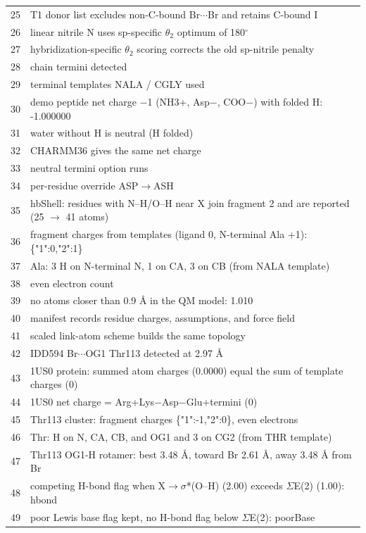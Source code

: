 {\begin{longtable}{rp{14.5cm}}
25 & T1 donor list excludes non-C-bound Br$\cdots$Br and retains C-bound I\\
26 & linear nitrile N uses sp-specific $\theta_2$ optimum of 180$^\circ$\\
27 & hybridization-specific $\theta_2$ scoring corrects the old sp-nitrile penalty\\
28 & chain termini detected\\
29 & terminal templates NALA / CGLY used\\
30 & demo peptide net charge $-$1 (NH3+, Asp$-$, COO$-$) with folded H: -1.000000\\
31 & water without H is neutral (H folded)\\
32 & CHARMM36 gives the same net charge\\
33 & neutral termini option runs\\
34 & per-residue override ASP$\to$ASH\\
35 & hbShell: residues with N--H/O--H near X join fragment 2 and are reported (25 $\to$ 41 atoms)\\
36 & fragment charges from templates (ligand 0, N-terminal Ala +1): \{"1":0,"2":1\}\\
37 & Ala: 3 H on N-terminal N, 1 on CA, 3 on CB (from NALA template)\\
38 & even electron count\\
39 & no atoms closer than 0.9 \AA{} in the QM model: 1.010\\
40 & manifest records residue charges, assumptions, and force field\\
41 & scaled link-atom scheme builds the same topology\\
42 & IDD594 Br$\cdots$OG1 Thr113 detected at 2.97 \AA{}\\
43 & 1US0 protein: summed atom charges (0.0000) equal the sum of template charges (0)\\
44 & 1US0 net charge = Arg+Lys$-$Asp$-$Glu+termini (0)\\
45 & Thr113 cluster: fragment charges \{"1":-1,"2":0\}, even electrons\\
46 & Thr: H on N, CA, CB, and OG1 and 3 on CG2 (from THR template)\\
47 & Thr113 OG1-H rotamer: best 3.48 \AA{}, toward Br 2.61 \AA{}, away 3.48 \AA{} from Br\\
48 & competing H-bond flag when X$\to\sigma$*(O--H) (2.00) exceeds $\Sigma$E(2) (1.00): hbond\\
49 & poor Lewis base flag kept, no H-bond flag below $\Sigma$E(2): poorBase\\

\end{longtable}}
